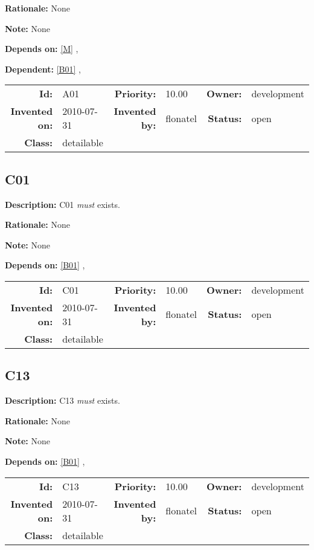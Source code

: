 \textbf{Rationale:} None

\textbf{Note:} None

\textbf{Depends on:} \ref{M} , 

\textbf{Dependent:} \ref{B01} , 

\par
{\small \begin{center}\begin{tabular}{rlrlrl}
\textbf{Id:} & A01 & \textbf{Priority:} & 10.00 & \textbf{Owner:} & development \\ 
\textbf{Invented on:} & 2010-07-31 & \textbf{Invented by:} & flonatel & \textbf{Status:} & open \\ 
\textbf{Class:} & detailable & & & & \\ 
\end{tabular}\end{center} }%
\subsection{C01}\label{C01}
\textbf{Description:} C01 \textsl{must} exists.

\textbf{Rationale:} None

\textbf{Note:} None

\textbf{Depends on:} \ref{B01} , 

\par
{\small \begin{center}\begin{tabular}{rlrlrl}
\textbf{Id:} & C01 & \textbf{Priority:} & 10.00 & \textbf{Owner:} & development \\ 
\textbf{Invented on:} & 2010-07-31 & \textbf{Invented by:} & flonatel & \textbf{Status:} & open \\ 
\textbf{Class:} & detailable & & & & \\ 
\end{tabular}\end{center} }%
\subsection{C13}\label{C13}
\textbf{Description:} C13 \textsl{must} exists.

\textbf{Rationale:} None

\textbf{Note:} None

\textbf{Depends on:} \ref{B01} , 

\par
{\small \begin{center}\begin{tabular}{rlrlrl}
\textbf{Id:} & C13 & \textbf{Priority:} & 10.00 & \textbf{Owner:} & development \\ 
\textbf{Invented on:} & 2010-07-31 & \textbf{Invented by:} & flonatel & \textbf{Status:} & open \\ 
\textbf{Class:} & detailable & & & & \\ 
\end{tabular}\end{center} }%
